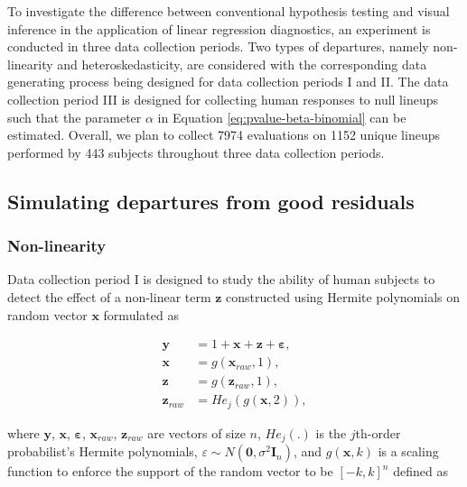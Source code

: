 \documentclass[]{interact}
\theoremstyle{plain}%
\theoremstyle{definition}
\theoremstyle{remark}
\begin{document}
To investigate the difference between conventional hypothesis testing
and visual inference in the application of linear regression
diagnostics, an experiment is conducted in three data collection
periods. Two types of departures, namely non-linearity and
heteroskedasticity, are considered with the corresponding data
generating process being designed for data collection periods I and II.
The data collection period III is designed for collecting human
responses to null lineups such that the parameter \(\alpha\) in Equation
\ref{eq:pvalue-beta-binomial} can be estimated. Overall, we plan to
collect 7974 evaluations on 1152 unique lineups performed by 443
subjects throughout three data collection periods.

\hypertarget{simulating-departures-from-good-residuals}{%
\subsection{Simulating departures from good
residuals}\label{simulating-departures-from-good-residuals}}

\hypertarget{non-linearity}{%
\subsubsection{Non-linearity}\label{non-linearity}}

Data collection period I is designed to study the ability of human
subjects to detect the effect of a non-linear term \(\boldsymbol{z}\)
constructed using Hermite polynomials on random vector
\(\boldsymbol{x}\) formulated as

\begin{align} \label{eq:nonlinearity-model}
\boldsymbol{y} &= 1 + \boldsymbol{x} + \boldsymbol{z} + \boldsymbol{\varepsilon},\\
\boldsymbol{x} &= g(\boldsymbol{x}_{raw}, 1), \\
\boldsymbol{z} &= g(\boldsymbol{z}_{raw}, 1), \\
\boldsymbol{z}_{raw} &= He_j(g(\boldsymbol{x}, 2)),
\end{align}

\noindent where \(\boldsymbol{y}\), \(\boldsymbol{x}\),
\(\boldsymbol{\varepsilon}\), \(\boldsymbol{x}_{raw}\),
\(\boldsymbol{z}_{raw}\) are vectors of size \(n\), \(He_{j}(.)\) is the
\(j\)th-order probabilist's Hermite polynomials,
\(\varepsilon \sim N(\boldsymbol{0}, \sigma^2\boldsymbol{I}_n)\), and
\(g(\boldsymbol{x}, k)\) is a scaling function to enforce the support of
the random vector to be \([-k, k]^n\) defined as
\end{document}

